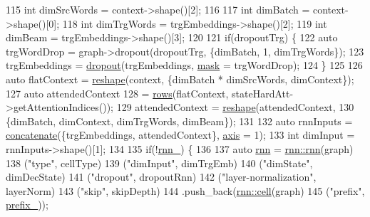 \begin{DoxyCode}
115     \textcolor{keywordtype}{int} dimSrcWords = context->shape()[2];
116 
117     \textcolor{keywordtype}{int} dimBatch = context->shape()[0];
118     \textcolor{keywordtype}{int} dimTrgWords = trgEmbeddings->shape()[2];
119     \textcolor{keywordtype}{int} dimBeam = trgEmbeddings->shape()[3];
120 
121     \textcolor{keywordflow}{if}(dropoutTrg) \{
122       \textcolor{keyword}{auto} trgWordDrop = graph->dropout(dropoutTrg, \{dimBatch, 1, dimTrgWords\});
123       trgEmbeddings = \hyperlink{namespacemarian_a268400392f22176821c7c4a36733b178}{dropout}(trgEmbeddings, \hyperlink{namespacemarian_1_1keywords_a201bea6bea8108889b63081132cc3cd7}{mask} = trgWordDrop);
124     \}
125 
126     \textcolor{keyword}{auto} flatContext = \hyperlink{namespacemarian_acd984f43188d0ae23c2a6ef13ae5293f}{reshape}(context, \{dimBatch * dimSrcWords, dimContext\});
127     \textcolor{keyword}{auto} attendedContext
128         = \hyperlink{namespacemarian_ace1e9a63d52edc363d70d661cf8d0257}{rows}(flatContext, stateHardAtt->getAttentionIndices());
129     attendedContext = \hyperlink{namespacemarian_acd984f43188d0ae23c2a6ef13ae5293f}{reshape}(attendedContext,
130                               \{dimBatch, dimContext, dimTrgWords, dimBeam\});
131 
132     \textcolor{keyword}{auto} rnnInputs = \hyperlink{namespacemarian_a2791a2c8f79a938f5cb22ae613680675}{concatenate}(\{trgEmbeddings, attendedContext\}, 
      \hyperlink{namespacemarian_1_1keywords_ace9158eabbddaca833133f12da98b9d6}{axis} = 1);
133     \textcolor{keywordtype}{int} dimInput = rnnInputs->shape()[1];
134 
135     \textcolor{keywordflow}{if}(!\hyperlink{classmarian_1_1DecoderHardAtt_a7e56a5d65ae8e1251b7c4fa572ac99a2}{rnn\_}) \{
136 
137       \textcolor{keyword}{auto} \hyperlink{namespacemarian_1_1rnn_aff1b115e415945b445f8d4a2068ec3e8}{rnn} = \hyperlink{namespacemarian_1_1rnn_aff1b115e415945b445f8d4a2068ec3e8}{rnn::rnn}(graph)
138                  (\textcolor{stringliteral}{"type"}, cellType)
139                  (\textcolor{stringliteral}{"dimInput"}, dimTrgEmb)
140                  (\textcolor{stringliteral}{"dimState"}, dimDecState)
141                  (\textcolor{stringliteral}{"dropout"}, dropoutRnn)
142                  (\textcolor{stringliteral}{"layer-normalization"}, layerNorm)
143                  (\textcolor{stringliteral}{"skip"}, skipDepth)
144                  .push\_back(\hyperlink{namespacemarian_1_1rnn_af723e51535e0b11de5b28fe19627a3fb}{rnn::cell}(graph)
145                             (\textcolor{stringliteral}{"prefix"}, \hyperlink{classmarian_1_1DecoderBase_a043a90801b6bda9a45e309607136e947}{prefix\_}));

\end{DoxyCode}
